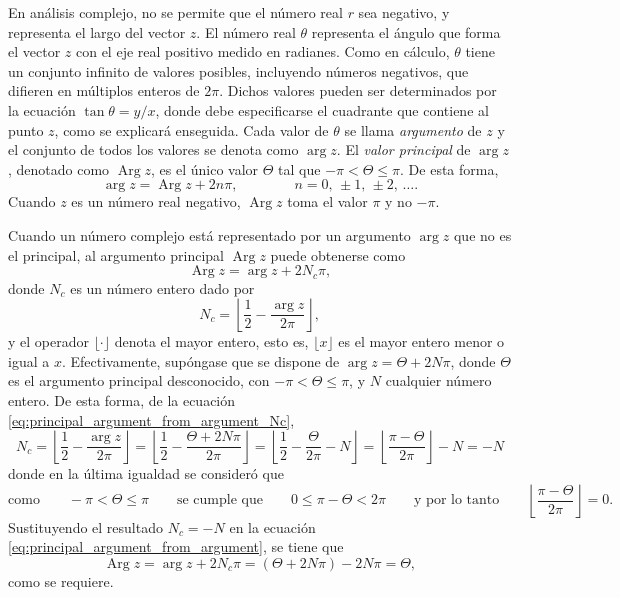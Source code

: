\documentclass[a4paper]{report}
\DeclareMathOperator{\Arg}{Arg}
\begin{document}
En análisis complejo, no se permite que el número real \(r\) sea negativo, y representa el largo del vector \(z\). El número real \(\theta\) representa el ángulo que forma el vector \(z\) con el eje real positivo medido en radianes. Como en cálculo, \(\theta\) tiene un conjunto infinito de valores posibles, incluyendo números negativos, que difieren en múltiplos enteros de \(2\pi\). Dichos valores pueden ser determinados por la ecuación \(\tan\theta=y/x\), donde debe especificarse el cuadrante que contiene al punto \(z\), como se explicará enseguida. Cada valor de \(\theta\) se llama \emph{argumento} de \(z\) y el conjunto de todos los valores se denota como \(\arg z\). El \emph{valor principal} de \(\arg z\), denotado como \(\Arg z\), es el único valor \(\Theta\) tal que \(-\pi<\Theta\leq\pi\). De esta forma,
\[
 \arg z=\Arg z+2n\pi,
 \qquad\qquad
 n=0,\,\pm1,\,\pm2,\,\dots.
\]
Cuando \(z\) es un número real negativo, \(\Arg z\) toma el valor \(\pi\) y no \(-\pi\).

Cuando un número complejo está representado por un argumento \(\arg z\) que no es el principal, al argumento principal \(\Arg z\) puede obtenerse como \cite{haber2019complex}
\begin{equation}\label{eq:principal_argument_from_argument}
 \Arg z=\arg z+2N_c\pi, 
\end{equation}
donde \(N_c\) es un número entero dado por 
\begin{equation}\label{eq:principal_argument_from_argument_Nc}
 N_c=\left\lfloor\frac{1}{2}-\frac{\arg z}{2\pi}\right\rfloor,
\end{equation}
y el operador \(\lfloor\cdot\rfloor\) denota el mayor entero, esto es, \(\lfloor x\rfloor\) es el mayor entero menor o igual a \(x\). Efectivamente, supóngase que se dispone de \(\arg z=\Theta+2N\pi\), donde \(\Theta\) es el argumento principal desconocido, con \(-\pi<\Theta\leq\pi\), y \(N\) cualquier número entero. De esta forma, de la ecuación \ref{eq:principal_argument_from_argument_Nc},
\[
 N_c=\left\lfloor\frac{1}{2}-\frac{\arg z}{2\pi}\right\rfloor
 =\left\lfloor\frac{1}{2}-\frac{\Theta+2N\pi}{2\pi}\right\rfloor
 =\left\lfloor\frac{1}{2}-\frac{\Theta}{2\pi}-N\right\rfloor
 =\left\lfloor\frac{\pi-\Theta}{2\pi}\right\rfloor-N
 =-N
\]
donde en la última igualdad se consideró que 
\[
 \textrm{como}\qquad
 -\pi<\Theta\leq\pi
 \qquad\textrm{se cumple que}\qquad 
 0\leq\pi-\Theta<2\pi
 \qquad\textrm{y por lo tanto}\qquad
 \left\lfloor\frac{\pi-\Theta}{2\pi}\right\rfloor=0.
\]
Sustituyendo el resultado \(N_c=-N\) en la ecuación \ref{eq:principal_argument_from_argument}, se tiene que 
\[
 \Arg z=\arg z+2N_c\pi=(\Theta+2N\pi)-2N\pi=\Theta,
\]
como se requiere.
\end{document}
